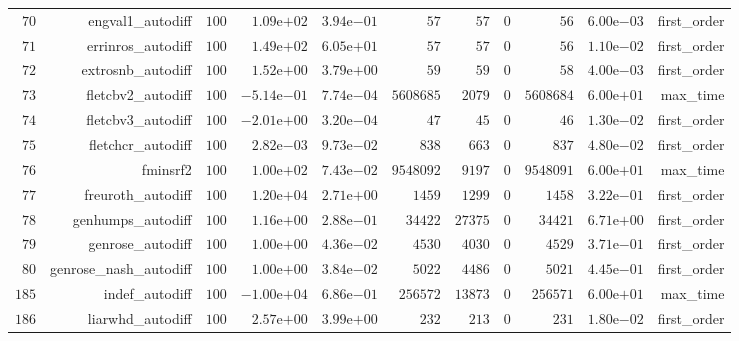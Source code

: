 \documentclass[varwidth=20cm,crop=true]{standalone}
\begin{document}
\begin{longtable}{rrrrrrrrrrr}
  \(    70\) & engval1\_autodiff & \(   100\) & \( 1.09\)e\(+02\) & \( 3.94\)e\(-01\) & \(    57\) & \(    57\) & \(     0\) & \(    56\) & \( 6.00\)e\(-03\) & first\_order \\
  \(    71\) & errinros\_autodiff & \(   100\) & \( 1.49\)e\(+02\) & \( 6.05\)e\(+01\) & \(    57\) & \(    57\) & \(     0\) & \(    56\) & \( 1.10\)e\(-02\) & first\_order \\
  \(    72\) & extrosnb\_autodiff & \(   100\) & \( 1.52\)e\(+00\) & \( 3.79\)e\(+00\) & \(    59\) & \(    59\) & \(     0\) & \(    58\) & \( 4.00\)e\(-03\) & first\_order \\
  \(    73\) & fletcbv2\_autodiff & \(   100\) & \(-5.14\)e\(-01\) & \( 7.74\)e\(-04\) & \(5608685\) & \(  2079\) & \(     0\) & \(5608684\) & \( 6.00\)e\(+01\) & max\_time \\
  \(    74\) & fletcbv3\_autodiff & \(   100\) & \(-2.01\)e\(+00\) & \( 3.20\)e\(-04\) & \(    47\) & \(    45\) & \(     0\) & \(    46\) & \( 1.30\)e\(-02\) & first\_order \\
  \(    75\) & fletchcr\_autodiff & \(   100\) & \( 2.82\)e\(-03\) & \( 9.73\)e\(-02\) & \(   838\) & \(   663\) & \(     0\) & \(   837\) & \( 4.80\)e\(-02\) & first\_order \\
  \(    76\) & fminsrf2 & \(   100\) & \( 1.00\)e\(+02\) & \( 7.43\)e\(-02\) & \(9548092\) & \(  9197\) & \(     0\) & \(9548091\) & \( 6.00\)e\(+01\) & max\_time \\
  \(    77\) & freuroth\_autodiff & \(   100\) & \( 1.20\)e\(+04\) & \( 2.71\)e\(+00\) & \(  1459\) & \(  1299\) & \(     0\) & \(  1458\) & \( 3.22\)e\(-01\) & first\_order \\
  \(    78\) & genhumps\_autodiff & \(   100\) & \( 1.16\)e\(+00\) & \( 2.88\)e\(-01\) & \( 34422\) & \( 27375\) & \(     0\) & \( 34421\) & \( 6.71\)e\(+00\) & first\_order \\
  \(    79\) & genrose\_autodiff & \(   100\) & \( 1.00\)e\(+00\) & \( 4.36\)e\(-02\) & \(  4530\) & \(  4030\) & \(     0\) & \(  4529\) & \( 3.71\)e\(-01\) & first\_order \\
  \(    80\) & genrose\_nash\_autodiff & \(   100\) & \( 1.00\)e\(+00\) & \( 3.84\)e\(-02\) & \(  5022\) & \(  4486\) & \(     0\) & \(  5021\) & \( 4.45\)e\(-01\) & first\_order \\
  \(   185\) & indef\_autodiff & \(   100\) & \(-1.00\)e\(+04\) & \( 6.86\)e\(-01\) & \(256572\) & \( 13873\) & \(     0\) & \(256571\) & \( 6.00\)e\(+01\) & max\_time \\
  \(   186\) & liarwhd\_autodiff & \(   100\) & \( 2.57\)e\(+00\) & \( 3.99\)e\(+00\) & \(   232\) & \(   213\) & \(     0\) & \(   231\) & \( 1.80\)e\(-02\) & first\_order \\

\end{longtable}
\end{document}

